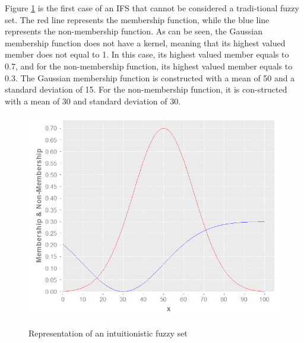 Figure \ref{figure:example-of-ifs} is the first case of an IFS that cannot be
considered a tradi-tional fuzzy set. The red line represents the membership
function, while the blue line represents the non-membership function. As can be
seen, the Gaussian membership function does not have a kernel, meaning that its
highest valued member does not equal to 1. In this case, its highest valued
member equals to 0.7, and for the non-membership function, its highest valued
member equals to 0.3. The Gaussian membership function is constructed with a
mean of 50 and a standard deviation of 15. For the non-membership function, it
is con-structed with a mean of 30 and standard deviation of 30.

\begin{figure}
\caption{Representation of an intuitionistic fuzzy set}
\centering
\includegraphics[width=1.0\textwidth]{img/example-of-ifs.png}
\label{figure:example-of-ifs}
\end{figure}
